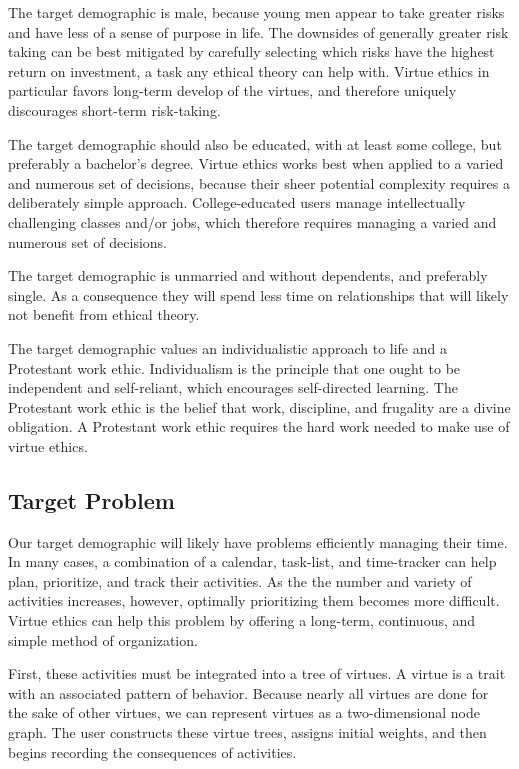\documentclass{article}
\begin{document}
The target demographic is male, because young men appear to take greater risks and have less of a sense of purpose in life.
The downsides of generally greater risk taking can be best mitigated by carefully selecting which risks have the highest return on investment, a task any ethical theory can help with.
Virtue ethics in particular favors long-term develop of the virtues, and therefore uniquely discourages short-term risk-taking.

The target demographic should also be educated, with at least some college, but preferably a bachelor's degree.
Virtue ethics works best when applied to a varied and numerous set of decisions, because their sheer potential complexity requires a deliberately simple approach.
College-educated users manage intellectually challenging classes and/or jobs, which therefore requires managing a varied and numerous set of decisions.

The target demographic is unmarried and without dependents, and preferably single.
As a consequence they will spend less time on relationships that will likely not benefit from ethical theory.

The target demographic values an individualistic approach to life and a Protestant work ethic.
Individualism is the principle that one ought to be independent and self-reliant, which encourages self-directed learning.
The Protestant work ethic is the belief that work, discipline, and frugality are a divine obligation.
A Protestant work ethic requires the hard work needed to make use of virtue ethics.

\subsection{Target Problem}

Our target demographic will likely have problems efficiently managing their time.
In many cases, a combination of a calendar, task-list, and time-tracker can help plan, prioritize, and track their activities.
As the the number and variety of activities increases, however, optimally prioritizing them becomes more difficult.
Virtue ethics can help this problem by offering a long-term, continuous, and simple method of organization.

First, these activities must be integrated into a tree of virtues.
A virtue is a trait with an associated pattern of behavior.
Because nearly all virtues are done for the sake of other virtues, we can represent virtues as a two-dimensional node graph.
The user constructs these virtue trees, assigns initial weights, and then begins recording the consequences of activities.
\end{document}
